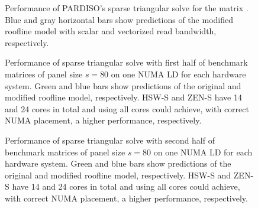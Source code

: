 \begin{figure}[t]
{\label{fig:p:single-core:zen-s}
} %
  \caption{Performance of PARDISO's sparse triangular solve
    for the matrix . %
    Blue and gray horizontal bars show predictions of the modified roofline model 
    with scalar and vectorized read bandwidth, respectively.
    }%
  \label{fig:p:single-core}%
\end{figure}


\begin{figure}%
  \centering%
  \begin{adjustbox}{angle=90}
  \end{adjustbox}
  \caption{Performance of sparse triangular solve with first half of benchmark matrices of
panel size $s=80$ on one NUMA LD for each hardware system.
  Green and blue bars show predictions of the original and modified roofline
model, respectively.
  HSW-S and ZEN-S have 14 and 24 cores in total and using all cores could
achieve, with correct NUMA placement, a higher performance, respectively.}
  \label{fig:p:pardiso-1}
\end{figure}

\begin{figure}%
  \centering%
  \begin{adjustbox}{angle=90}
  \end{adjustbox}
  \caption{Performance of sparse triangular solve with second half of benchmark matrices of
panel size $s=80$ on one NUMA LD for each hardware system.
  Green and blue bars show predictions of the original and modified roofline
model, respectively.
  HSW-S and ZEN-S have 14 and 24 cores in total and using all cores could
achieve, with correct NUMA placement, a higher performance, respectively.}
  \label{fig:p:pardiso-2}
\end{figure}

